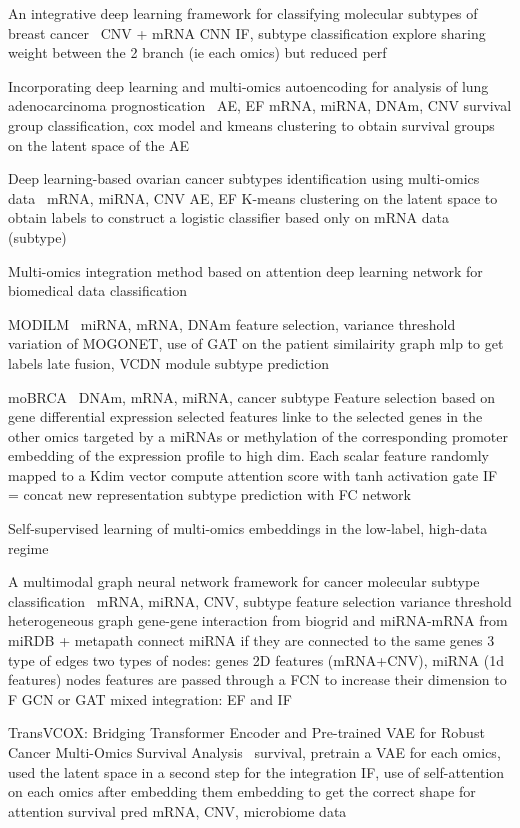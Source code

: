 \documentclass[../main.tex]{subfiles}
\begin{document}
		An integrative deep learning framework for classifying molecular subtypes of breast cancer~\cite{MohaiminulIslam2020}
		CNV + mRNA
		CNN IF, subtype classification
		explore sharing weight between the 2 branch (ie each omics) but reduced perf



		Incorporating deep learning and multi-omics autoencoding for analysis of lung adenocarcinoma prognostication~\cite{Lee2020}
		AE, EF
		mRNA, miRNA, DNAm, CNV
		survival group classification, cox model and kmeans clustering to obtain survival groups on the latent space of the AE

		Deep learning-based ovarian cancer subtypes identification using multi-omics data~\cite{Guo2020}
		mRNA, miRNA, CNV
		AE, EF
		K-means clustering on the latent space to obtain labels to construct a logistic classifier based only on mRNA data (subtype)

		Multi-omics integration method based on attention deep learning network for biomedical data classification

		MODILM~\cite{MODILM}
		miRNA, mRNA, DNAm
		feature selection, variance threshold
		variation of MOGONET, use of GAT on the patient similairity graph
		mlp to get labels
		late fusion, VCDN module
		subtype prediction

		moBRCA~\cite{moBRCA}
		DNAm, mRNA, miRNA, cancer subtype
		Feature selection based on gene differential expression
		selected features linke to the selected genes in the other omics
		targeted by a miRNAs or methylation of the corresponding promoter
		embedding of the expression profile to high dim. Each scalar feature randomly mapped to a Kdim vector
		compute attention score with tanh activation gate
		IF = concat new representation
		subtype prediction with FC network

		Self-supervised learning of multi-omics embeddings in the low-label, high-data regime

		A multimodal graph neural network framework for cancer molecular subtype classification~\cite{Li2024}
		mRNA, miRNA, CNV, subtype
		feature selection variance threshold
		heterogeneous graph gene-gene interaction from biogrid and miRNA-mRNA from miRDB + metapath connect miRNA if they are connected to the same genes
		3 type of edges
		two types of nodes: genes 2D features (mRNA+CNV), miRNA (1d features)
		nodes features are passed through a FCN to increase their dimension to F
		GCN or GAT
		mixed integration: EF and IF

		TransVCOX: Bridging Transformer Encoder and Pre-trained VAE for Robust Cancer Multi-Omics Survival Analysis~\cite{10385668}
		survival, pretrain a VAE for each omics, used the latent space in a second step for the integration
		IF, use of self-attention on each omics after embedding them embedding to get the correct shape for attention
		survival pred
		mRNA, CNV, microbiome data
\end{document}
